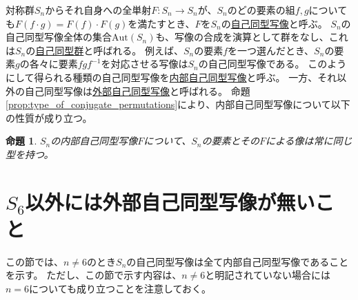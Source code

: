 \documentclass[11pt]{jarticle}
\newtheorem{proposition}{命題}
\begin{document}
対称群$S_n$からそれ自身への全単射$F \colon S_n \to S_n$が、$S_n$のどの要素の組$f,g$についても$F(f \cdot g) = F(f) \cdot F(g)$を満たすとき、$F$を$S_n$の\underline{自己同型写像}と呼ぶ。
$S_n$の自己同型写像全体の集合$\mathrm{Aut}(S_n)$も、写像の合成を演算として群をなし、これは$S_n$の\underline{自己同型群}と呼ばれる。
例えば、$S_n$の要素$f$を一つ選んだとき、$S_n$の要素$g$の各々に要素$f g f^{-1}$を対応させる写像は$S_n$の自己同型写像である。
このようにして得られる種類の自己同型写像を\underline{内部自己同型写像}と呼ぶ。
一方、それ以外の自己同型写像は\underline{外部自己同型写像}と呼ばれる。
命題\ref{prop:type_of_conjugate_permutations}により、内部自己同型写像について以下の性質が成り立つ。

\begin{proposition}
\label{prop:type_and_inner_automorphism}
$S_n$の内部自己同型写像$F$について、$S_n$の要素とその$F$による像は常に同じ型を持つ。
\end{proposition}


\section{$S_6$以外には外部自己同型写像が無いこと}

この節では、$n \neq 6$のとき$S_n$の自己同型写像は全て内部自己同型写像であることを示す。
ただし、この節で示す内容は、$n \neq 6$と明記されていない場合には$n = 6$についても成り立つことを注意しておく。
\end{document}

